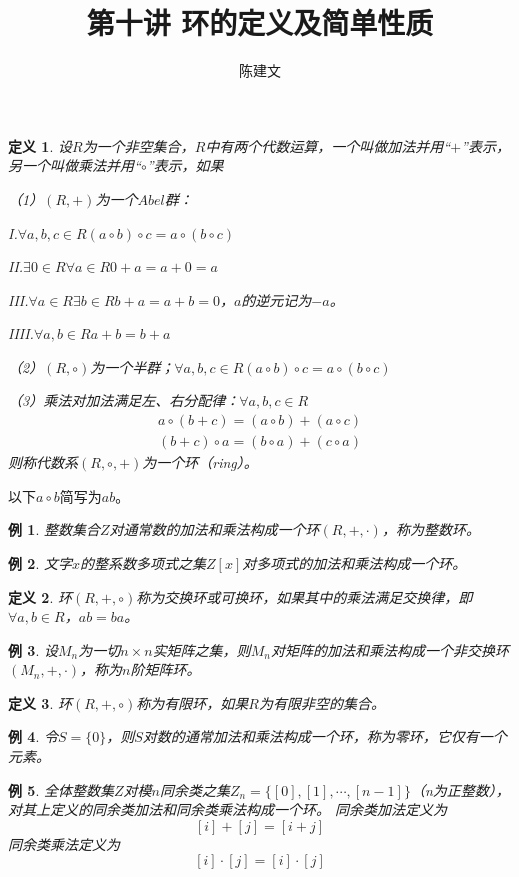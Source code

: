 \documentclass{article}
\newtheorem{Def}{定义}
\newtheorem*{Example}{例}
\begin{document}
\begin{CJK*}{UTF8}{gbsn}
  \title{第十讲 环的定义及简单性质}
  \author{陈建文}
  \maketitle
  
\begin{Def}
  设$R$为一个非空集合，$R$中有两个代数运算，一个叫做加法并用“$+$”表示，另一个叫做乘法并用“$\circ$”表示，如果

  （1）$(R,+)$为一个$Abel$群：

  I.$\forall a,b,c\in R(a\circ b)\circ c=a\circ (b\circ c)$

  II.$\exists 0\in R \forall a\in R 0+a=a+0=a$

  III.$\forall a\in R \exists b\in R b+a = a+b =0$，$a$的逆元记为$-a$。

  IIII.$\forall a,b\in R a+b=b+a$

  （2）$(R,\circ)$为一个半群；$\forall a,b,c\in R (a\circ b)\circ c=a\circ (b\circ c)$

  （3）乘法对加法满足左、右分配律：$\forall a,b,c\in R$
\begin{align*}
  a\circ(b+c)=(a\circ b)+(a\circ c)\\
  (b+c)\circ a=(b\circ a) + (c\circ a)
\end{align*}
则称代数系$(R,\circ,+)$为一个环（ring）。
\end{Def}
以下$a\circ b$简写为$ab$。
\begin{Example}
  整数集合$Z$对通常数的加法和乘法构成一个环$(R,+,\cdot)$，称为整数环。
\end{Example}

\begin{Example}
  文字$x$的整系数多项式之集$Z[x]$对多项式的加法和乘法构成一个环。
\end{Example}

\begin{Def}
环$(R,+,\circ)$称为交换环或可换环，如果其中的乘法满足交换律，即$\forall a,b\in R$，$ab=ba$。
\end{Def}

\begin{Example}
  设$M_n$为一切$n\times n$实矩阵之集，则$M_n$对矩阵的加法和乘法构成一个非交换环$(M_n,+,\cdot)$，称为$n$阶矩阵环。
\end{Example}

\begin{Def}
  环$(R,+,\circ)$称为有限环，如果$R$为有限非空的集合。
\end{Def}
\begin{Example}
  令$S=\{0\}$，则$S$对数的通常加法和乘法构成一个环，称为零环，它仅有一个元素。
\end{Example}
\begin{Example}
  全体整数集$Z$对模$n$同余类之集$Z_n=\{[0],[1],\cdots,[n-1]\}$（n为正整数），对其上定义的同余类加法和同余类乘法构成一个环。
  同余类加法定义为
  \[[i]+[j]=[i+j]\]
  同余类乘法定义为
  \[[i]\cdot [j]=[i]\cdot[j]\]


\end{Example}
\end{CJK*}
\end{document}
